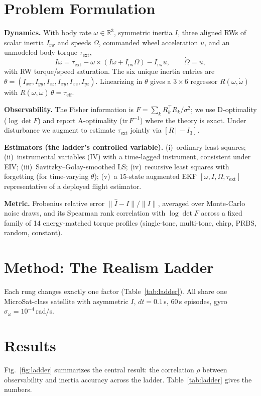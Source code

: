 \documentclass[conference]{IEEEtran}
\begin{document}
\section{Problem Formulation}
\textbf{Dynamics.} With body rate $\omega\in\mathbb{R}^3$, symmetric inertia $I$, three aligned RWs of scalar inertia $I_\mathrm{rw}$ and speeds $\Omega$, commanded wheel acceleration $u$, and an unmodeled body torque $\tau_\mathrm{ext}$,
\begin{equation}
I\dot{\omega} = \tau_\mathrm{ext} - \omega\times(I\omega + I_\mathrm{rw}\Omega) - I_\mathrm{rw} u, \qquad \dot{\Omega}=u,
\end{equation}
with RW torque/speed saturation. The six unique inertia entries are $\theta=(I_{xx},I_{yy},I_{zz},I_{xy},I_{xz},I_{yz})$. Linearizing in $\theta$ gives a $3\times6$ regressor $R(\omega,\dot\omega)$ with $R(\omega,\dot\omega)\,\theta=\tau_\mathrm{eff}$.

\textbf{Observability.} The Fisher information is $F=\sum_k R_k^\top R_k/\sigma^2$; we use D-optimality ($\log\det F$) and report A-optimality ($\mathrm{tr}\,F^{-1}$) where the theory is exact. Under disturbance we augment to estimate $\tau_\mathrm{ext}$ jointly via $[R\,|\,{-}I_3]$.

\textbf{Estimators (the ladder's controlled variable).} (i)~ordinary least squares; (ii)~instrumental variables (IV) with a time-lagged instrument, consistent under EIV; (iii)~Savitzky--Golay-smoothed LS; (iv)~recursive least squares with forgetting (for time-varying $\theta$); (v)~a 15-state augmented EKF $[\omega,I,\Omega,\tau_\mathrm{ext}]$ representative of a deployed flight estimator.

\textbf{Metric.} Frobenius relative error $\lVert\hat I-I\rVert/\lVert I\rVert$, averaged over Monte-Carlo noise draws, and its Spearman rank correlation with $\log\det F$ across a fixed family of 14 energy-matched torque profiles (single-tone, multi-tone, chirp, PRBS, random, constant).

\section{Method: The Realism Ladder}
Each rung changes exactly one factor (Table~\ref{tab:ladder}). All share one MicroSat-class satellite with asymmetric $I$, $dt=0.1$\,s, 60\,s episodes, gyro $\sigma_\omega=10^{-4}$\,rad/s.

\section{Results}
Fig.~\ref{fig:ladder} summarizes the central result: the correlation $\rho$ between observability and inertia accuracy across the ladder. Table~\ref{tab:ladder} gives the numbers.
\end{document}
